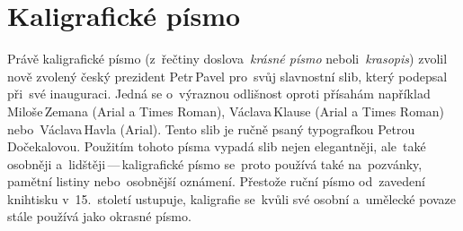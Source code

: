 \documentclass[a4paper, 11pt]{article}
\begin{document}
\section*{Kaligrafické písmo}

Právě kaligrafické písmo (z~řečtiny doslova~\emph{krásné písmo}
neboli~\emph{krasopis}) zvolil nově zvolený český prezident Petr\,Pavel
pro~svůj slavnostní slib, který podepsal~
při~své inauguraci. Jedná se o~výraznou odlišnost oproti přísahám
například Miloše\,Zemana (Arial a Times Roman),
Václava\,Klause (Arial a Times Roman) nebo~Václava\,Havla (Arial).
Tento slib je ručně psaný typografkou Petrou\,Dočekalovou.
\parencite{Font:2023:SlibPrezidenta}
Použitím tohoto písma vypadá slib nejen elegantněji, ale~také osobněji
a~lidštěji\,---\,kaligrafické písmo se~proto používá také
na~pozvánky, pamětní listiny nebo~osobnější oznámení.
\parencite{Kaucky:2018:Kaligrafie}
Přestože ruční písmo od~zavedení knihtisku v~15.\ století ustupuje,
kaligrafie se~kvůli své osobní a~umělecké povaze stále používá jako
okrasné písmo. \parencite{Zapf:2007:Alphabet}

\newpage
\renewcommand{\refname}{Literatura}
\printbibliography{}
\end{document}
